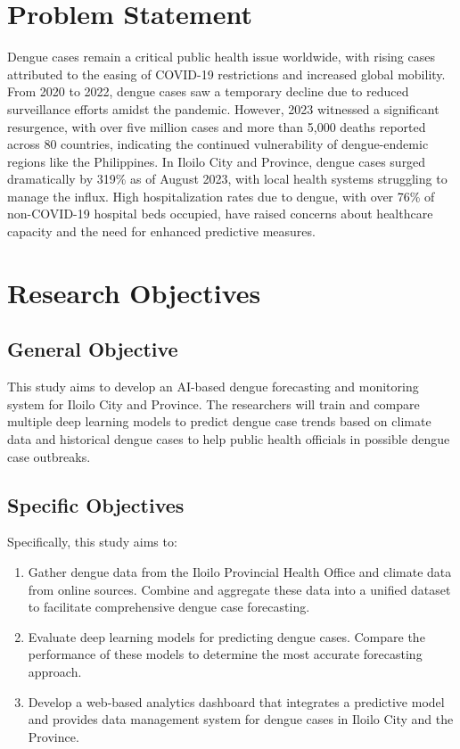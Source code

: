 \section{Problem Statement}
Dengue cases remain a critical public health issue worldwide,
 with rising cases attributed to the easing of COVID-19 restrictions and increased global mobility. 
 From 2020 to 2022, dengue cases saw a temporary decline due to reduced surveillance efforts amidst the pandemic. 
 However, 2023 witnessed a significant resurgence, with over five million cases and more than 5,000 deaths reported 
 across 80 countries, indicating the continued vulnerability of dengue-endemic regions like the Philippines. 
 In Iloilo City and Province, dengue cases surged dramatically by 319\% as of August 2023, 
 with local health systems struggling to manage the influx. High hospitalization rates due to dengue, with over
  76\% of non-COVID-19 hospital beds occupied, have raised concerns about healthcare capacity and the need for enhanced predictive measures. 

\section{Research Objectives}
\label{sec:researchobjectives}

\subsection{General Objective}
\label{sec:generalobjective}

This study aims to develop an AI-based dengue forecasting and monitoring system for Iloilo City and Province. 
The researchers will train and compare multiple deep learning models to predict dengue case trends based on climate data and 
historical dengue cases to help public health officials in possible dengue case outbreaks.


\subsection{Specific Objectives}
\label{sec:specificobjectives}

%
%

Specifically, this study aims to:


\begin{enumerate}
	\item Gather dengue data from the Iloilo Provincial Health Office and climate data from online sources. Combine and aggregate these data into a unified dataset to facilitate comprehensive dengue case forecasting.
	\item Evaluate deep learning models for predicting dengue cases. Compare the performance of these models to determine the most accurate forecasting approach.
	\item Develop a web-based analytics dashboard that integrates a predictive model and provides data management  system for dengue cases in  Iloilo City and the Province.
\end{enumerate}


